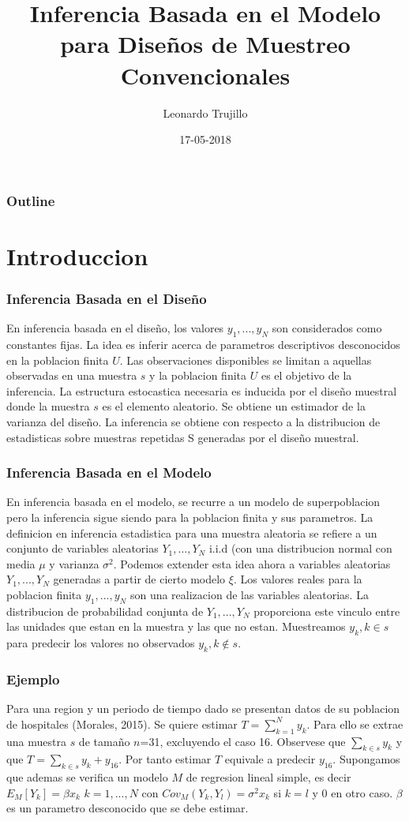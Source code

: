 ﻿\documentclass{beamer}
\title[Inferencia Basada en el Modelo]{Inferencia Basada en el Modelo para Dise\~nos de Muestreo Convencionales}
\author[Trujillo, Leonardo]{Leonardo Trujillo}
\institute[]{Departamento de Estadistica\\Universidad Nacional de Colombia\\Seminario del Departamento}
\date{17-05-2018}
\begin{document}
\frame{\titlepage}

\begin{frame}
\frametitle{Outline}
\tableofcontents
\end{frame}

\section{Introduccion}
 \tableofcontents[currentsection]

\begin{frame}[allowframebreaks*]
\frametitle{Inferencia Basada en el Dise\~no}
En inferencia basada en el dise\~no, los valores $y_1, ..., y_N$ son considerados como constantes fijas. La idea es inferir acerca de parametros descriptivos desconocidos en la poblacion finita $U$. Las observaciones disponibles se limitan a aquellas observadas en una muestra $s$ y la poblacion finita $U$ es el objetivo de la inferencia. La estructura estocastica necesaria es inducida por el dise\~no muestral donde la muestra $s$ es el elemento aleatorio. Se obtiene un estimador de la varianza del dise\~no. La inferencia se obtiene con respecto a la distribucion de estadisticas sobre muestras repetidas S generadas por el diseño muestral.
\end{frame}

\begin{frame}[allowframebreaks*]
\frametitle{Inferencia Basada en el Modelo}
En inferencia basada en el modelo, se recurre a un modelo de superpoblacion pero la inferencia sigue siendo para la poblacion finita y sus parametros. La definicion en inferencia estadistica para una muestra aleatoria se refiere a un conjunto de variables aleatorias $Y_1, ..., Y_N$ i.i.d (con una distribucion normal con media $\mu$ y varianza $\sigma^2$. Podemos extender esta idea ahora a variables aleatorias $Y_1, ..., Y_N$ generadas a partir de cierto modelo $\xi$. Los valores reales para la poblacion finita $y_1, ..., y_N$ son una realizacion de las variables aleatorias. La distribucion de probabilidad conjunta de $Y_1, ..., Y_N$ proporciona este vinculo entre las unidades que estan en la muestra y las que no estan. Muestreamos ${y_k, k \in s}$ para predecir los valores no observados ${y_k, k \notin s}$.
\end{frame}

\begin{frame}[allowframebreaks*]
\frametitle{Ejemplo}
Para una region y un periodo de tiempo dado se presentan datos de su poblacion de hospitales (Morales, 2015). Se quiere estimar $T=\sum\limits_{k=1}^{N}y_k$. Para ello se extrae una muestra $s$ de tama\~no $n$=31, excluyendo el caso 16. Observese que $\sum\limits_{k \in s}y_k$ y que $T=\sum\limits_{k \in s}y_k + y_{16}$. Por tanto estimar $T$ equivale a predecir $y_{16}$. Supongamos que ademas se verifica un modelo $M$ de regresion lineal simple, es decir $E_M[Y_k]=\beta x_k$ $k=1, ...,N$ con $Cov_M(Y_k,Y_l)=\sigma^2 x_k$ si $k=l$ y 0 en otro caso. $\beta$ es un parametro desconocido que se debe estimar.
\end{frame}
\end{document}
